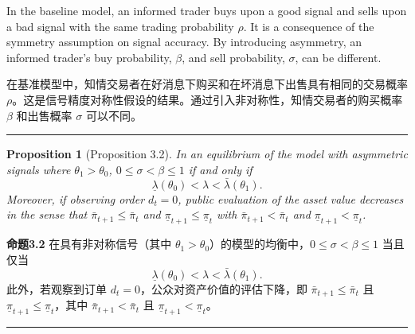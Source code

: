 \documentclass[12pt,a4paper]{article}
\newenvironment{original}{%
  \par\vspace{4pt}\noindent%
  \color{black}%
  \ignorespaces
}{%
  \par\vspace{2pt}%
}
\newenvironment{translation}{%
  \par\vspace{2pt}\noindent%
  \color{transblue}%
  \ignorespaces
}{%
  \par\vspace{4pt}\hrule\vspace{6pt}%
}
\newtheorem{proposition}[theorem]{Proposition}
\begin{document}
\begin{original}
In the baseline model, an informed trader buys upon a good signal and sells upon a bad signal with the same trading probability $\rho$. It is a consequence of the symmetry assumption on signal accuracy. By introducing asymmetry, an informed trader's buy probability, $\beta$, and sell probability, $\sigma$, can be different.
\end{original}
\begin{translation}
在基准模型中，知情交易者在好消息下购买和在坏消息下出售具有相同的交易概率 $\rho$。这是信号精度对称性假设的结果。通过引入非对称性，知情交易者的购买概率 $\beta$ 和出售概率 $\sigma$ 可以不同。
\end{translation}

\begin{proposition}[Proposition 3.2]
In an equilibrium of the model with asymmetric signals where $\theta_1 > \theta_0$, $0 \leq \sigma < \beta \leq 1$ if and only if
\[
\underline{\lambda}(\theta_0) < \lambda < \bar{\lambda}(\theta_1). \tag{3.2}
\]
Moreover, if observing order $d_t = 0$, public evaluation of the asset value decreases in the sense that $\bar{\pi}_{t+1} \leq \bar{\pi}_t$ and $\underline{\pi}_{t+1} \leq \underline{\pi}_t$ with $\bar{\pi}_{t+1} < \bar{\pi}_t$ and $\underline{\pi}_{t+1} < \underline{\pi}_t$.
\end{proposition}
\begin{translation}
\textbf{命题3.2} 在具有非对称信号（其中 $\theta_1 > \theta_0$）的模型的均衡中，$0 \leq \sigma < \beta \leq 1$ 当且仅当
\[
\underline{\lambda}(\theta_0) < \lambda < \bar{\lambda}(\theta_1). \tag{3.2}
\]
此外，若观察到订单 $d_t = 0$，公众对资产价值的评估下降，即 $\bar{\pi}_{t+1} \leq \bar{\pi}_t$ 且 $\underline{\pi}_{t+1} \leq \underline{\pi}_t$，其中 $\bar{\pi}_{t+1} < \bar{\pi}_t$ 且 $\underline{\pi}_{t+1} < \underline{\pi}_t$。
\end{translation}
\end{document}
